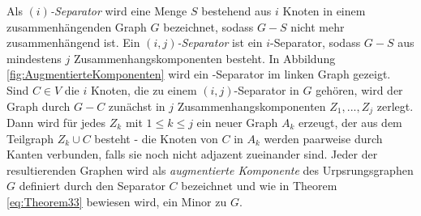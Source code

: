 Als \emph{$(i)$-Separator} wird eine Menge $S$ bestehend aus $i$ Knoten in einem zusammenhängenden Graph $G$ bezeichnet, sodass $G - S$ nicht mehr zusammenhängend ist.
Ein \emph{$(i, j)$-Separator} ist ein $i$-Separator, sodass $G-S$ aus mindestens $j$ Zusammenhangskomponenten besteht.
In Abbildung \ref{fig:AugmentierteKomponenten} wird ein \dd-Separator im linken Graph gezeigt.
Sind $C \in V$ die $i$ Knoten, die zu einem $(i, j)$-Separator in $G$ gehören, wird der Graph durch $G - C$ zunächst in $j$ Zusammenhangskomponenten $Z_1, ..., Z_j$ zerlegt.
Dann wird für jedes $Z_k$ mit $1 \leq k \leq j$ ein neuer Graph $A_k$ erzeugt, der aus dem Teilgraph $Z_k \cup C$ besteht - die Knoten von $C$ in $A_k$ werden paarweise durch Kanten verbunden, falls sie noch nicht adjazent zueinander sind.
Jeder der resultierenden Graphen wird als \emph{augmentierte Komponente} des Urpsrungsgraphen $G$ definiert durch den Separator $C$ bezeichnet und wie in Theorem \ref{eq:Theorem33} bewiesen wird, \evtl ein Minor zu $G$.

